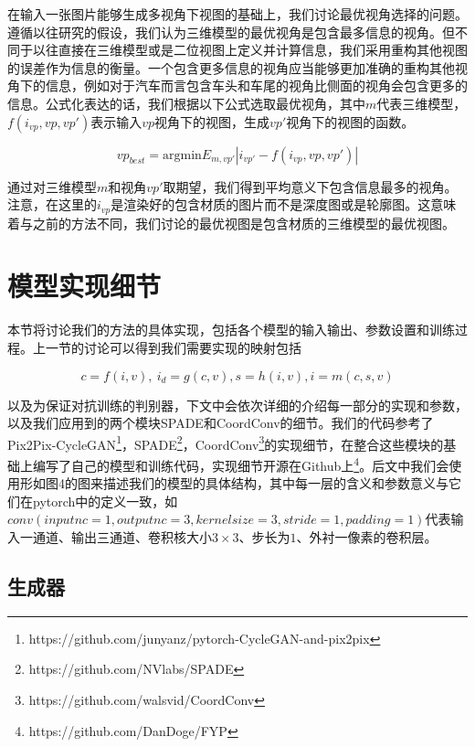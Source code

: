 \documentclass[UTF8,openany,AutoFakeBold,AutoFakeSlant,cs4size]{ctexbook}
\begin{document}
在输入一张图片能够生成多视角下视图的基础上，我们讨论最优视角选择的问题。遵循以往研究的假设，我们认为三维模型的最优视角是包含最多信息的视角。但不同于以往直接在三维模型或是二位视图上定义并计算信息，我们采用重构其他视图的误差作为信息的衡量。一个包含更多信息的视角应当能够更加准确的重构其他视角下的信息，例如对于汽车而言包含车头和车尾的视角比侧面的视角会包含更多的信息。公式化表达的话，我们根据以下公式选取最优视角，其中$m$代表三维模型，$f(i_{vp}, vp, vp')$表示输入$vp$视角下的视图，生成$vp'$视角下的视图的函数。

\begin{equation}
	vp_{best} = \mbox{argmin} E_{m, vp'} | i_{vp'} - f(i_{vp}, vp, vp')|
\end{equation}


通过对三维模型$m$和视角$vp'$取期望，我们得到平均意义下包含信息最多的视角。注意，在这里的$i_{vp}$是渲染好的包含材质的图片而不是深度图或是轮廓图。这意味着与之前的方法不同，我们讨论的最优视图是包含材质的三维模型的最优视图。

\section{模型实现细节}

本节将讨论我们的方法的具体实现，包括各个模型的输入输出、参数设置和训练过程。上一节的讨论可以得到我们需要实现的映射包括

\begin{equation}
	c = f(i, v),\ i_d = g(c, v), s = h(i ,v), i = m(c, s, v)
\end{equation}

以及为保证对抗训练的判别器，下文中会依次详细的介绍每一部分的实现和参数，以及我们应用到的两个模块SPADE\cite{park2019SPADE}和CoordConv\cite{NIPS2018_8169}的细节。我们的代码参考了Pix2Pix-CycleGAN\footnote{https://github.com/junyanz/pytorch-CycleGAN-and-pix2pix}，SPADE\footnote{https://github.com/NVlabs/SPADE}，CoordConv\footnote{https://github.com/walsvid/CoordConv}的实现细节，在整合这些模块的基础上编写了自己的模型和训练代码，实现细节开源在Github上\footnote{https://github.com/DanDoge/FYP}。后文中我们会使用形如图4的图来描述我们的模型的具体结构，其中每一层的含义和参数意义与它们在pytorch\cite{NEURIPS2019_9015}中的定义一致，如$conv(inputnc=1, outputnc=3, kernelsize=3, stride=1, padding=1)$代表输入一通道、输出三通道、卷积核大小$3 \times 3$、步长为$1$、外衬一像素的卷积层。

\subsection{生成器}
\end{document}
